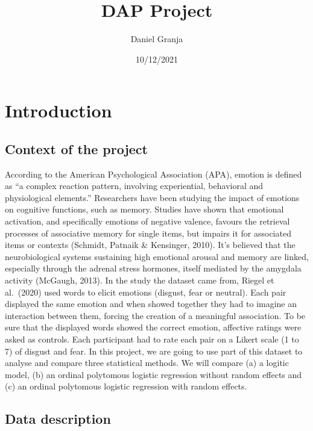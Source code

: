 \documentclass[
]{article}
\title{DAP Project}
\author{Daniel Granja}
\date{10/12/2021}
\begin{document}
\maketitle

\hypertarget{introduction}{%
\section{Introduction}\label{introduction}}

\hypertarget{context-of-the-project}{%
\subsection{Context of the project}\label{context-of-the-project}}

According to the American Psychological Association (APA), emotion is
defined as ``a complex reaction pattern, involving experiential,
behavioral and physiological elements.'' Researchers have been studying
the impact of emotions on cognitive functions, such as memory. Studies
have shown that emotional activation, and specifically emotions of
negative valence, favours the retrieval processes of associative memory
for single items, but impairs it for associated items or contexts
(Schmidt, Patnaik \& Kensinger, 2010). It's believed that the
neurobiological systems sustaining high emotional arousal and memory are
linked, especially through the adrenal stress hormones, itself mediated
by the amygdala activity (McGaugh, 2013). In the study the dataset came
from, Riegel et al.~(2020) used words to elicit emotions (disgust, fear
or neutral). Each pair displayed the same emotion and when showed
together they had to imagine an interaction between them, forcing the
creation of a meaningful association. To be sure that the displayed
words showed the correct emotion, affective ratings were asked as
controls. Each participant had to rate each pair on a Likert scale (1 to
7) of disgust and fear. In this project, we are going to use part of
this dataset to analyse and compare three statistical methods. We will
compare (a) a logitic model, (b) an ordinal polytomous logistic
regression without random effects and (c) an ordinal polytomous logistic
regression with random effects.

\hypertarget{data-description}{%
\subsection{Data description}\label{data-description}}
\end{document}
